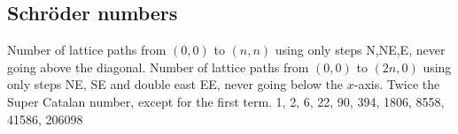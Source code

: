 	\subsection{Schröder numbers}
		Number of lattice paths from $(0,0)$ to $(n,n)$ using only steps N,NE,E, never going above the diagonal. Number of lattice paths from $(0,0)$ to $(2n,0)$ using only steps NE, SE and double east EE, never going below the $x$-axis. Twice the Super Catalan number, except for the first term.
		1, 2, 6, 22, 90, 394, 1806, 8558, 41586, 206098

